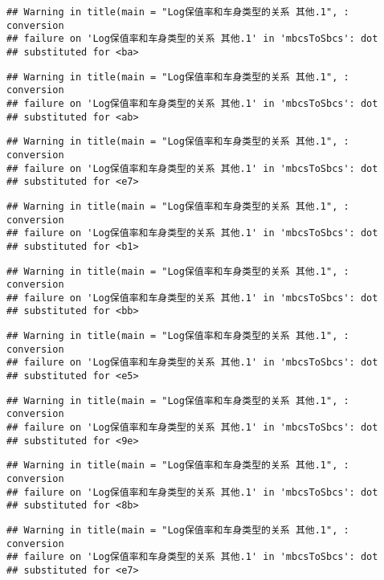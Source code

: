 \documentclass[]{article}
\begin{document}
\begin{verbatim}
## Warning in title(main = "Log保值率和车身类型的关系 其他.1", : conversion
## failure on 'Log保值率和车身类型的关系 其他.1' in 'mbcsToSbcs': dot
## substituted for <ba>
\end{verbatim}

\begin{verbatim}
## Warning in title(main = "Log保值率和车身类型的关系 其他.1", : conversion
## failure on 'Log保值率和车身类型的关系 其他.1' in 'mbcsToSbcs': dot
## substituted for <ab>
\end{verbatim}

\begin{verbatim}
## Warning in title(main = "Log保值率和车身类型的关系 其他.1", : conversion
## failure on 'Log保值率和车身类型的关系 其他.1' in 'mbcsToSbcs': dot
## substituted for <e7>
\end{verbatim}

\begin{verbatim}
## Warning in title(main = "Log保值率和车身类型的关系 其他.1", : conversion
## failure on 'Log保值率和车身类型的关系 其他.1' in 'mbcsToSbcs': dot
## substituted for <b1>
\end{verbatim}

\begin{verbatim}
## Warning in title(main = "Log保值率和车身类型的关系 其他.1", : conversion
## failure on 'Log保值率和车身类型的关系 其他.1' in 'mbcsToSbcs': dot
## substituted for <bb>
\end{verbatim}

\begin{verbatim}
## Warning in title(main = "Log保值率和车身类型的关系 其他.1", : conversion
## failure on 'Log保值率和车身类型的关系 其他.1' in 'mbcsToSbcs': dot
## substituted for <e5>
\end{verbatim}

\begin{verbatim}
## Warning in title(main = "Log保值率和车身类型的关系 其他.1", : conversion
## failure on 'Log保值率和车身类型的关系 其他.1' in 'mbcsToSbcs': dot
## substituted for <9e>
\end{verbatim}

\begin{verbatim}
## Warning in title(main = "Log保值率和车身类型的关系 其他.1", : conversion
## failure on 'Log保值率和车身类型的关系 其他.1' in 'mbcsToSbcs': dot
## substituted for <8b>
\end{verbatim}

\begin{verbatim}
## Warning in title(main = "Log保值率和车身类型的关系 其他.1", : conversion
## failure on 'Log保值率和车身类型的关系 其他.1' in 'mbcsToSbcs': dot
## substituted for <e7>
\end{verbatim}
\end{document}
